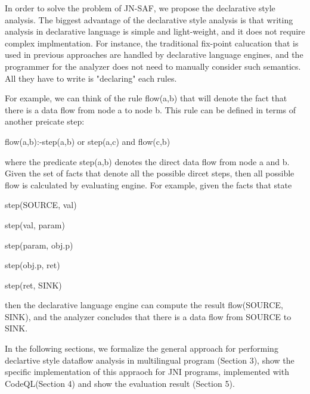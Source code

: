 In order to solve the problem of JN-SAF, we propose the declarative style
analysis.  The biggest advantage of the declarative style analysis is that
writing analysis in declarative language is simple and light-weight, and it
does not require complex implmentation. For instance, the traditional fix-point
calucation that is used in previous approaches are handled by declarative
language engines, and the programmer for the analyzer does not need to manually
consider such semantics. All they have to write is "declaring" each rules.

For example, we can think of the rule flow(a,b) that will denote the fact that
there is a data flow from node a to node b. This rule can be defined in terms
of another preicate step:

flow(a,b):-step(a,b) or step(a,c) and flow(c,b)

where the predicate step(a,b) denotes the direct data flow from node a and b.
Given the set of facts that denote all the possible dircet steps, then all
possible flow is calculated by evaluating engine. For example, given the facts
that state

step(SOURCE, val)

step(val, param)

step(param, obj.p)

step(obj.p, ret)

step(ret, SINK)

then the declarative language engine can compute the result flow(SOURCE, SINK),
and the analyzer concludes that there is a data flow from SOURCE to SINK.

In the following sections, we formalize the general approach for performing
declartive style dataflow analysis in multilingual program (Section 3), show
the specific implementation of this appraoch for JNI programs, implemented with
CodeQL(Section 4) and show the evaluation result (Section 5).
